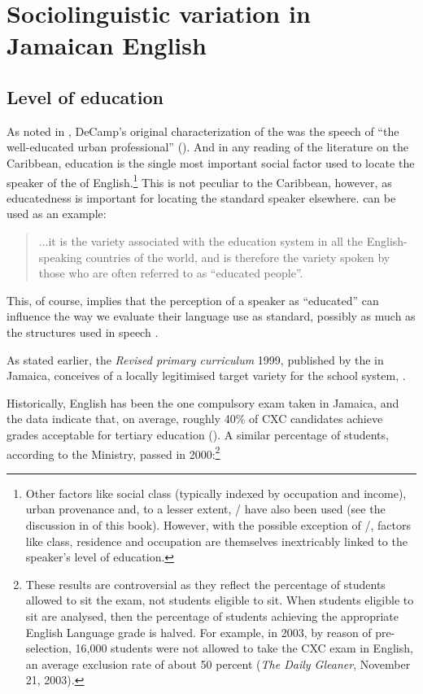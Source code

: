 \chapter{Sociolinguistic variation in Jamaican English}\label{ch:3}
\section{Level of education}\label{sec:3.1}

As noted in , DeCamp’s original characterization of the  was the speech of  “the well-educated urban professional” (\citeyear[82]{DeCamp1961}).  And in any reading of the literature on the Caribbean, education is the single most important social factor used to locate the speaker of the  of English.\footnote{Other factors like social class (typically indexed by occupation and income), urban provenance and, to a lesser extent, \slash {} have also been used (see the discussion in  of this book).  However, with the possible exception of \slash {}, factors like class, residence and occupation are themselves inextricably linked to the speaker’s level of education.}  This is not peculiar to the Caribbean, however, as educatedness is important for locating the standard speaker elsewhere.  \citet[118]{Trudgill1999} can be used as an example:

\begin{quote}
...it is the variety associated with the education system in all the English-speaking countries of the world, and is therefore the variety spoken by those who are often referred to as ``educated people''. 
\end{quote}

This, of course, implies that the perception of a speaker as “educated” can influence the way we evaluate their language use as standard, possibly as much as the structures used in speech \citep{ThakerarGilesCheshire1982}.

As stated earlier, the \textit{Revised primary curriculum} 1999, published by the  in Jamaica, conceives of a locally legitimised target variety for the school system, .

Historically, English has been the one compulsory exam taken in Jamaica, and the data indicate that, on average, roughly 40\% of CXC candidates achieve grades acceptable for tertiary education (\citealt[222]{Miller1989}).  A similar percentage of students, according to the Ministry, passed in 2000:\footnote{These results are controversial as they reflect the percentage of students allowed to sit the exam, not students eligible to sit.  When students eligible to sit are analysed, then the percentage of students achieving the appropriate English Language grade is halved.  For example, in 2003, by reason of pre-selection, 16,000 students were not allowed to take the CXC exam in English, an average exclusion rate of about 50 percent (\textit{The Daily Gleaner}, November 21, 2003).}%

